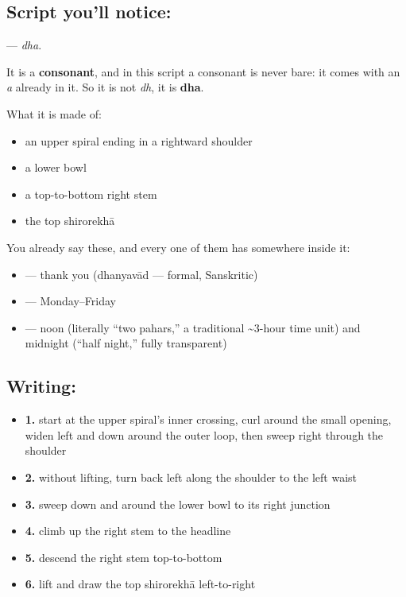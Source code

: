\subsection*{Script you'll notice: }
\textbf{} — \emph{dha}.

It is a \textbf{consonant}, and in this script a consonant is never bare: it comes with an \emph{a} already in it. So it is not \emph{dh}, it is \textbf{dha}.

What it is made of:

\begin{itemize}
\raggedright
  \item an upper spiral ending in a rightward shoulder
  \item a lower bowl
  \item a top-to-bottom right stem
  \item the top shirorekhā
\end{itemize}

You already say these, and every one of them has  somewhere inside it:

\begin{itemize}
\raggedright
  \item \textbf{} — thank you (dhanyavād — formal, Sanskritic)
  \item \textbf{    } — Monday–Friday
  \item \textbf{  } — noon (literally \textquotedblleft{}two pahars,\textquotedblright{} a traditional \textasciitilde{}3-hour time unit) and midnight (\textquotedblleft{}half night,\textquotedblright{} fully transparent)
\end{itemize}

\subsection*{Writing: }

\begin{itemize}
\raggedright
  \item \textbf{1.} start at the upper spiral's inner crossing, curl around the small opening, widen left and down around the outer loop, then sweep right through the shoulder
  \item \textbf{2.} without lifting, turn back left along the shoulder to the left waist
  \item \textbf{3.} sweep down and around the lower bowl to its right junction
  \item \textbf{4.} climb up the right stem to the headline
  \item \textbf{5.} descend the right stem top-to-bottom
  \item \textbf{6.} lift and draw the top shirorekhā left-to-right
\end{itemize}

